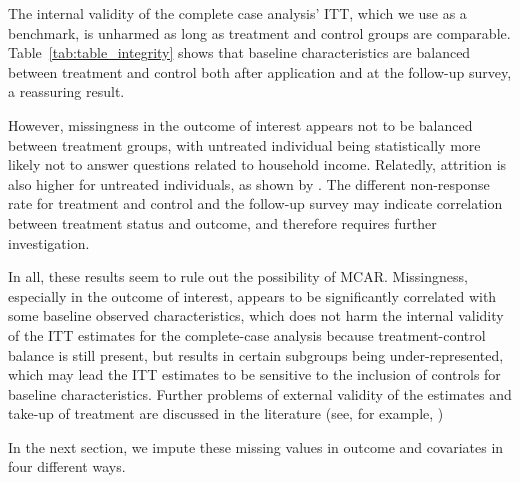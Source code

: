 The internal validity of the complete case analysis' \ac{ITT}, which we use as a benchmark, is unharmed as long as treatment and control groups are comparable. Table~\ref{tab:table_integrity} shows that baseline characteristics are balanced between treatment and control both after application and at the follow-up survey, a reassuring result.

However, missingness in the outcome of interest appears not to be balanced between treatment groups, with untreated individual being statistically more likely not to answer questions related to household income. Relatedly, attrition is also higher for untreated individuals, as shown by \cite{fairlie2015behind}. The different non-response rate for treatment and control and the follow-up survey may indicate correlation between treatment status and outcome, and therefore requires further investigation.

In all, these results seem to rule out the possibility of \ac{MCAR}. Missingness, especially in the outcome of interest, appears to be significantly correlated with some baseline observed characteristics, which does not harm the internal validity of the \ac{ITT} estimates for the complete-case analysis because treatment-control balance is still present, but results in certain subgroups being under-represented, which may lead the \ac{ITT} estimates to be sensitive to the inclusion of controls for baseline characteristics. Further problems of external validity of the estimates and take-up of treatment are discussed in the literature (see, for example, \cite{millan2017})

In the next section, we impute these missing values in outcome and covariates in four different ways.